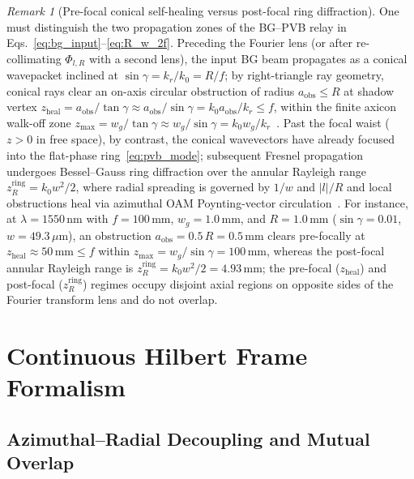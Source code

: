 \documentclass[aps,pra,onecolumn,notitlepage,11pt,tightenlines,nofootinbib,floatfix,longbibliography]{revtex4-2}
\theoremstyle{remark}
\newtheorem{remark}{Remark}
\newcommand{\abs}[1]{\lvert #1 \rvert}
\begin{document}
\begin{remark}[Pre-focal conical self-healing versus post-focal ring diffraction]
\label{rem:propagation}
One must distinguish the two propagation zones of the BG--PVB relay in Eqs.~\eqref{eq:bg_input}--\eqref{eq:R_w_2f}. Preceding the Fourier lens (or after re-collimating $\Phi_{l,R}$ with a second lens), the input BG beam propagates as a conical wavepacket inclined at $\sin\gamma = k_r/k_0 = R/f$; by right-triangle ray geometry, conical rays clear an on-axis circular obstruction of radius $a_{\mathrm{obs}} \le R$ at shadow vertex $z_{\mathrm{heal}} = a_{\mathrm{obs}}/\tan\gamma \approx a_{\mathrm{obs}}/\sin\gamma = k_0 a_{\mathrm{obs}}/k_r \le f$, within the finite axicon walk-off zone $z_{\max} = w_g/\tan\gamma \approx w_g/\sin\gamma = k_0 w_g/k_r$~\cite{Gori1987}. Past the focal waist ($z > 0$ in free space), by contrast, the conical wavevectors have already focused into the flat-phase ring~\eqref{eq:pvb_mode}; subsequent Fresnel propagation undergoes Bessel--Gauss ring diffraction over the annular Rayleigh range $z_R^{\mathrm{ring}} = k_0 w^2/2$, where radial spreading is governed by $1/w$ and $\abs{l}/R$ and local obstructions heal via azimuthal OAM Poynting-vector circulation~\cite{Reddy2016}. For instance, at $\lambda = 1550\,\mathrm{nm}$ with $f = 100\,\mathrm{mm}$, $w_g = 1.0\,\mathrm{mm}$, and $R = 1.0\,\mathrm{mm}$ ($\sin\gamma = 0.01$, $w = 49.3\,\mu\mathrm{m}$), an obstruction $a_{\mathrm{obs}} = 0.5\,R = 0.5\,\mathrm{mm}$ clears pre-focally at $z_{\mathrm{heal}} \approx 50\,\mathrm{mm} \le f$ within $z_{\max} = w_g/\sin\gamma = 100\,\mathrm{mm}$, whereas the post-focal annular Rayleigh range is $z_R^{\mathrm{ring}} = k_0 w^2/2 = 4.93\,\mathrm{mm}$; the pre-focal ($z_{\mathrm{heal}}$) and post-focal ($z_R^{\mathrm{ring}}$) regimes occupy disjoint axial regions on opposite sides of the Fourier transform lens and do not overlap.
\end{remark}

\section{Continuous Hilbert Frame Formalism}
\label{sec:frame_theory}

\subsection{Azimuthal--Radial Decoupling and Mutual Overlap}
\label{subsec:decoupling}
\end{document}
